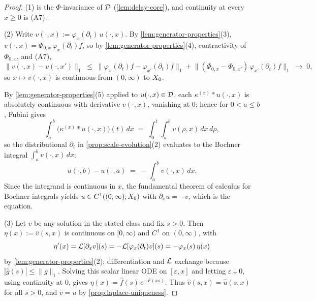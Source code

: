 \begin{proof}
(1) is the $\Phi$-invariance of $\mathcal{D}$ (\ref{lem:delay-core}), and continuity at every
$x \ge 0$ is (A7).

(2) Write $v(\cdot, x) := \varphi_x(\partial_t)\, u(\cdot, x)$. By
\ref{lem:generator-properties}(3), $v(\cdot, x) = \Phi_{0,x}\,\varphi_x(\partial_t) f$, so by
\ref{lem:generator-properties}(4), contractivity of $\Phi_{0,x}$, and (A7),
\[
  \|v(\cdot,x) - v(\cdot,x')\|_1
  \;\le\; \bigl\|\varphi_x(\partial_t)f - \varphi_{x'}(\partial_t)f\bigr\|_1
  + \bigl\|(\Phi_{0,x} - \Phi_{0,x'})\,\varphi_{x'}(\partial_t)f\bigr\|_1
  \;\longrightarrow\; 0,
\]
so $x \mapsto v(\cdot, x)$ is continuous from $(0,\infty)$ to $X_0$.

By \ref{lem:generator-properties}(5) applied to $u(\cdot,x) \in \mathcal{D}$, each
$\kappa^{(x)} * u(\cdot, x)$ is absolutely continuous with derivative $v(\cdot, x)$, vanishing
at $0$; hence for $0 < a \le b$, Fubini gives
\[
  \int_a^b \bigl(\kappa^{(x)} * u(\cdot, x)\bigr)(t)\,dx
  \;=\; \int_0^t \int_a^b v(\rho, x)\,dx\,d\rho ,
\]
so the distributional $\partial_t$ in \ref{prop:scale-evolution}(2) evaluates to the Bochner
integral $\int_a^b v(\cdot, x)\,dx$:
\[
  u(\cdot, b) - u(\cdot, a) \;=\; -\int_a^b v(\cdot, x)\,dx .
\]
Since the integrand is continuous in $x$, the fundamental theorem of calculus for Bochner
integrals yields $u \in C^1((0,\infty); X_0)$ with $\partial_x u = -v$, which is the equation.

(3) Let $v$ be any solution in the stated class and fix $s > 0$. Then $\eta(x) := \hat v(s, x)$
is continuous on $[0,\infty)$ and $C^1$ on $(0,\infty)$, with
\[
  \eta'(x) = \mathcal{L}[\partial_x v](s) = -\mathcal{L}[\varphi_x(\partial_t) v](s) = -\varphi_x(s)\,\eta(x)
\]
by \ref{lem:generator-properties}(2); differentiation and $\mathcal{L}$ exchange because
$|\hat g(s)| \le \|g\|_1$. Solving this scalar linear ODE on $[\varepsilon, x]$ and letting
$\varepsilon \downarrow 0$, using continuity at $0$, gives $\eta(x) = \hat f(s)\, e^{-F(xs)}$.
Thus $\hat v(s, x) = \hat u(s, x)$ for all $s > 0$, and $v = u$ by
\ref{prop:laplace-uniqueness}.
\end{proof}

